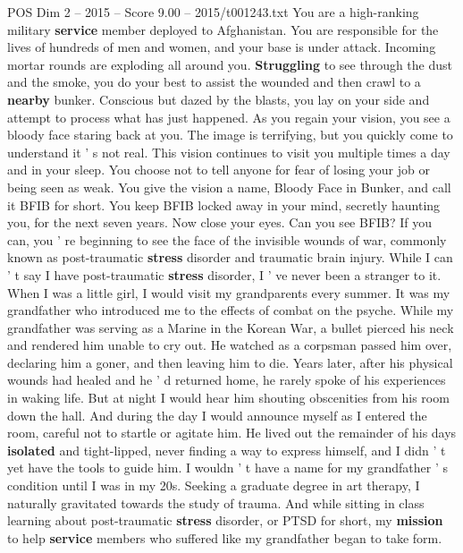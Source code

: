 \begin{textsample}{POS Dim 2 – 2015 – Score 9.00 – 2015/t001243.txt}  \label{ex:f2_pos_060}
You are a high-ranking military \textbf{service} member deployed to Afghanistan.
You are responsible for the lives of hundreds of men and women, and your base is under attack.
Incoming mortar rounds are exploding all around you. \textbf{Struggling} to see through the dust and the smoke, you do your best to assist the wounded and then crawl to a \textbf{nearby} bunker.
Conscious but dazed by the blasts, you lay on your side and attempt to process what has just happened.
As you regain your vision, you see a bloody face staring back at you.
The image is terrifying, but you quickly come to understand it ' s not real.
This vision continues to visit you multiple times a day and in your sleep.
You choose not to tell anyone for fear of losing your job or being seen as weak.
You give the vision a name, Bloody Face in Bunker, and call it BFIB for short.
You keep BFIB locked away in your mind, secretly haunting you, for the next seven years.
Now close your eyes.
Can you see BFIB?
If you can, you ' re beginning to see the face of the invisible wounds of war, commonly known as post-traumatic \textbf{stress} disorder and traumatic brain injury.
While I can ' t say I have post-traumatic \textbf{stress} disorder, I ' ve never been a stranger to it.
When I was a little girl, I would visit my grandparents every summer.
It was my grandfather who introduced me to the effects of combat on the psyche.
While my grandfather was serving as a Marine in the Korean War, a bullet pierced his neck and rendered him unable to cry out.
He watched as a corpsman passed him over, declaring him a goner, and then leaving him to die.
Years later, after his physical wounds had healed and he ' d returned home, he rarely spoke of his experiences in waking life.
But at night I would hear him shouting obscenities from his room down the hall.
And during the day I would announce myself as I entered the room, careful not to startle or agitate him.
He lived out the remainder of his days \textbf{isolated} and tight-lipped, never finding a way to express himself, and I didn ' t yet have the tools to guide him.
I wouldn ' t have a name for my grandfather ' s condition until I was in my 20s.
Seeking a graduate degree in art therapy, I naturally gravitated towards the study of trauma.
And while sitting in class learning about post-traumatic \textbf{stress} disorder, or PTSD for short, my \textbf{mission} to help \textbf{service} members who suffered like my grandfather began to take form.

\end{textsample}
